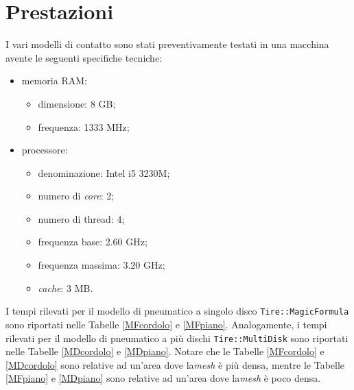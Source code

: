 \section{Prestazioni}
I vari modelli di contatto sono stati preventivamente testati in una macchina avente le seguenti specifiche tecniche:
\begin{itemize}
	\item memoria RAM:
	\begin{itemize}
		\item dimensione: 8 GB;
		\item frequenza: 1333 MHz;
	\end{itemize}
	\item processore:
	\begin{itemize}
		\item denominazione: Intel i5 3230M;
		\item numero di \textit{core}: 2;
		\item numero di thread: 4;
		\item frequenza base: 2.60 GHz;
		\item frequenza massima: 3.20 GHz;
		\item \textit{cache}: 3 MB.
	\end{itemize}
\end{itemize}
I tempi rilevati per il modello di pneumatico a singolo disco \texttt{Tire::MagicFormula} sono riportati nelle Tabelle \ref{MFcordolo} e \ref{MFpiano}. Analogamente, i tempi rilevati per il modello di pneumatico a più dischi \texttt{Tire::MultiDisk} sono riportati nelle Tabelle \ref{MDcordolo} e \ref{MDpiano}. Notare che le Tabelle \ref{MFcordolo} e \ref{MDcordolo} sono relative ad un'area dove la\textit{mesh} è più densa, mentre le Tabelle \ref{MFpiano} e \ref{MDpiano} sono relative ad un'area dove la\textit{mesh} è poco densa.\\[1cm]

